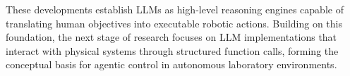 These developments establish LLMs as high-level reasoning engines capable of translating human objectives into executable robotic actions. Building on this foundation, the next stage of research focuses on LLM implementations that interact with physical systems through structured function calls, forming the conceptual basis for agentic control in autonomous laboratory environments.
